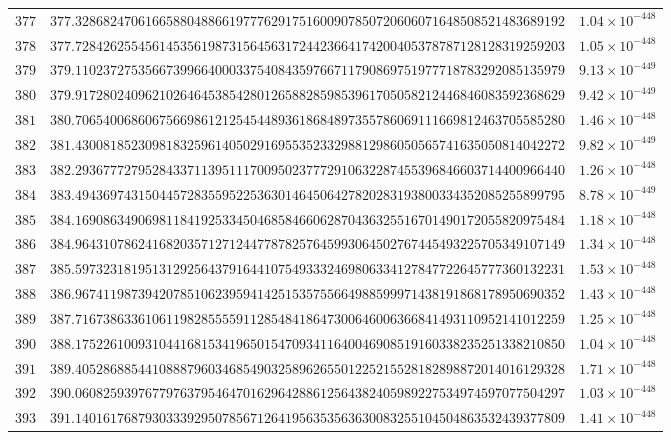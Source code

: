 \documentclass[12pt,reqno]{amsart}
\theoremstyle{remark}
\begin{document}
\begin{longtable}{clc}
$377$ & $377.3286824706166588048866197776291751600907850720606071648508521483689192$ & $1.04\times 10^{-448}$ \\
$378$ & $377.7284262554561453561987315645631724423664174200405378787128128319259203$ & $1.05\times 10^{-448}$ \\
$379$ & $379.1102372753566739966400033754084359766711790869751977718783292085135979$ & $9.13\times 10^{-449}$ \\
$380$ & $379.9172802409621026464538542801265882859853961705058212446846083592368629$ & $9.42\times 10^{-449}$ \\
$381$ & $380.7065400686067566986121254544893618684897355786069111669812463705585280$ & $1.46\times 10^{-448}$ \\
$382$ & $381.4300818523098183259614050291695535233298812986050565741635050814042272$ & $9.82\times 10^{-449}$ \\
$383$ & $382.2936777279528433711395111700950237772910632287455396846603714400966440$ & $1.26\times 10^{-448}$ \\
$384$ & $383.4943697431504457283559522536301464506427820283193800334352085255899795$ & $8.78\times 10^{-449}$ \\
$385$ & $384.1690863490698118419253345046858466062870436325516701490172055820975484$ & $1.18\times 10^{-448}$ \\
$386$ & $384.9643107862416820357127124477878257645993064502767445493225705349107149$ & $1.34\times 10^{-448}$ \\
$387$ & $385.5973231819513129256437916441075493332469806334127847722645777360132231$ & $1.53\times 10^{-448}$ \\
$388$ & $386.9674119873942078510623959414251535755664988599971438191868178950690352$ & $1.43\times 10^{-448}$ \\
$389$ & $387.7167386336106119828555591128548418647300646006366841493110952141012259$ & $1.25\times 10^{-448}$ \\
$390$ & $388.1752261009310441681534196501547093411640046908519160338235251338210850$ & $1.04\times 10^{-448}$ \\
$391$ & $389.4052868854410888796034685490325896265501225215528182898872014016129328$ & $1.71\times 10^{-448}$ \\
$392$ & $390.0608259397677976379546470162964288612564382405989227534974597077504297$ & $1.03\times 10^{-448}$ \\
$393$ & $391.1401617687930333929507856712641956353563630083255104504863532439377809$ & $1.41\times 10^{-448}$ \\

\end{longtable}
\end{document}
